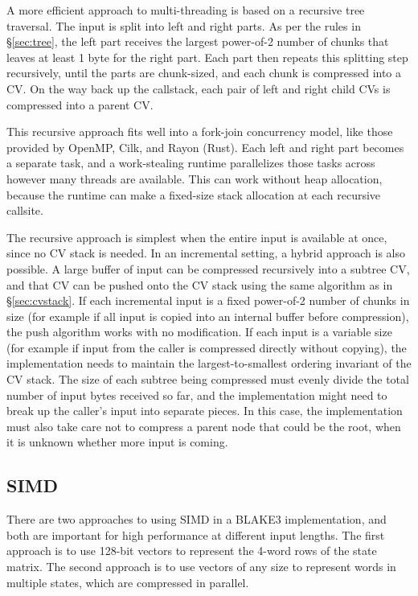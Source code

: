 \documentclass[11pt,notitlepage,a4paper]{article}
\begin{document}
A more efficient approach to multi-threading is based on a recursive tree
traversal. The input is split into left and right parts. As per the rules in
\S\ref{sec:tree}, the left part receives the largest power-of-2 number of
chunks that leaves at least 1 byte for the right part. Each part then repeats
this splitting step recursively, until the parts are chunk-sized, and each
chunk is compressed into a CV. On the way back up the callstack, each pair of
left and right child CVs is compressed into a parent CV.

This recursive approach fits well into a fork-join concurrency model, like
those provided by OpenMP, Cilk, and Rayon (Rust). Each left and right part
becomes a separate task, and a work-stealing runtime parallelizes those tasks
across however many threads are available. This can work without heap
allocation, because the runtime can make a fixed-size stack allocation at each
recursive callsite.

The recursive approach is simplest when the entire input is available at once,
since no CV stack is needed. In an incremental setting, a hybrid approach is
also possible. A large buffer of input can be compressed recursively into a
subtree CV, and that CV can be pushed onto the CV stack using the same
algorithm as in \S\ref{sec:cvstack}. If each incremental input is a fixed
power-of-2 number of chunks in size (for example if all input is copied into an
internal buffer before compression), the push algorithm works with no
modification. If each input is a variable size (for example if input from the
caller is compressed directly without copying), the implementation needs to
maintain the largest-to-smallest ordering invariant of the CV stack. The size
of each subtree being compressed must evenly divide the total number of input
bytes received so far, and the implementation might need to break up the
caller's input into separate pieces. In this case, the implementation must also
take care not to compress a parent node that could be the root, when it is
unknown whether more input is coming.

\subsection{SIMD}\label{sec:simd}

There are two approaches to using SIMD in a BLAKE3 implementation, and both are
important for high performance at different input lengths. The first approach
is to use 128-bit vectors to represent the 4-word rows of the state matrix. The
second approach is to use vectors of any size to represent words in multiple
states, which are compressed in parallel.
\end{document}
